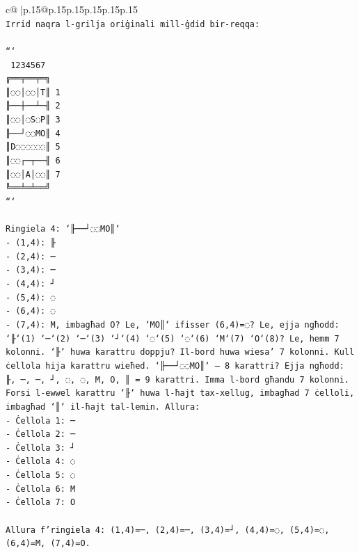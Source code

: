 \documentclass{article}
\begin{document}
{\begin{supertabular}{c@{$\;$}|p{.15\linewidth}@{}p{.15\linewidth}p{.15\linewidth}p{.15\linewidth}p{.15\linewidth}p{.15\linewidth}}
{{{\\ 
\texttt{Irrid naqra l{-}grilja oriġinali mill{-}ġdid bir{-}reqqa:} \\
\\ 
\texttt{```} \\
\texttt{ 1234567} \\
\texttt{╔══╤══╤═╗} \\
\texttt{║◌◌│◌◌│T║ 1} \\
\texttt{╟──┼──┴─╢ 2} \\
\texttt{║◌◌│◌S◌P║ 3} \\
\texttt{╟──┘◌◌MO║ 4} \\
\texttt{║D◌◌◌◌◌◌║ 5} \\
\texttt{║◌◌┌─┬──╢ 6} \\
\texttt{║◌◌│A│◌◌║ 7} \\
\texttt{╚══╧═╧══╝} \\
\texttt{```} \\
\\ 
\texttt{Ringiela 4: `╟──┘◌◌MO║`} \\
\texttt{{-} (1,4): ╟} \\
\texttt{{-} (2,4): ─} \\
\texttt{{-} (3,4): ─} \\
\texttt{{-} (4,4): ┘} \\
\texttt{{-} (5,4): ◌} \\
\texttt{{-} (6,4): ◌} \\
\texttt{{-} (7,4): M, imbagħad O? Le, `MO║` ifisser (6,4)=◌? Le, ejja ngħodd: `╟`(1) `─`(2) `─`(3) `┘`(4) `◌`(5) `◌`(6) `M`(7) `O`(8)? Le, hemm 7 kolonni. `╟` huwa karattru doppju? Il{-}bord huwa wiesa' 7 kolonni. Kull ċellola hija karattru wieħed. `╟──┘◌◌MO║` — 8 karattri? Ejja ngħodd: ╟, ─, ─, ┘, ◌, ◌, M, O, ║ = 9 karattri. Imma l{-}bord għandu 7 kolonni. Forsi l{-}ewwel karattru `╟` huwa l{-}ħajt tax{-}xellug, imbagħad 7 ċelloli, imbagħad `║` il{-}ħajt tal{-}lemin. Allura:} \\
\texttt{{-} Ċellola 1: ─} \\
\texttt{{-} Ċellola 2: ─} \\
\texttt{{-} Ċellola 3: ┘} \\
\texttt{{-} Ċellola 4: ◌} \\
\texttt{{-} Ċellola 5: ◌} \\
\texttt{{-} Ċellola 6: M} \\
\texttt{{-} Ċellola 7: O} \\
\\ 
\texttt{Allura f'ringiela 4: (1,4)=─, (2,4)=─, (3,4)=┘, (4,4)=◌, (5,4)=◌, (6,4)=M, (7,4)=O.} \\
}}}
\end{supertabular}}
\end{document}
